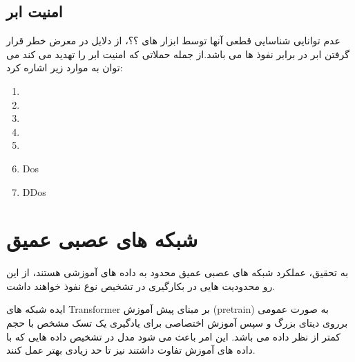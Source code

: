 \documentclass{report}
\begin{document}
		\subsection{امنیت ابر}
			عدم توانایی شناسایی قطعی آنها توسط ابزار های ؟؟، از دلایل در معرض خطر قرار گرفتن ابر در برابر نفوذ ها می باشد.از جمله حملاتی که امنیت ابر را تهدید می کند می توان به موارد زیر اشاره کرد:
			
			\begin{enumerate}
				\item
				\item 
				\item 
				\item 
				\item
				\item Dos
				\item DDos
			\end{enumerate}
			
			
		\section{
		شبکه های عصبی عمیق
		}
			به تحقیق، عملکرد شبکه های عصبی عمیق محدود به داده های آموزشی هستند، از این رو محدودیت هایی در بکارگیری در تشخیص نوع نفوذ خواهند داشت.
			
			ایده شبکه های Transformer بر مبنای پیش آموزش (pretrain) به صورت عمومی برروی دیتای بزرگ و سپس آموزش اختصاصی برای یادگیری یک تسک مشخص  با حجم کمتر از نظر داده می باشد. این امر باعث می شود مدل در تشخیص داده هایی که با داده های آموزش تفاوت داشتند نیز تا حد زیادی بهتر عمل کنند.
			
\end{document}
